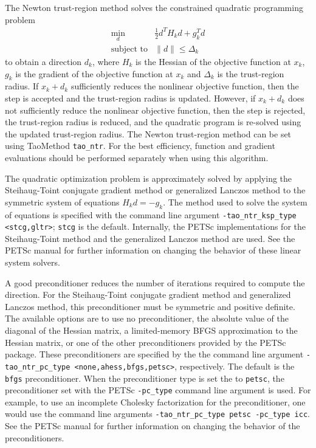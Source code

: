 The Newton trust-region method solves the constrained quadratic programming
problem
\[
\begin{array}{ll}
\min_d  & \frac{1}{2}d^T H_k d  + g_k^T d \\
\mbox{subject to} & \|d\| \leq \Delta_k
\end{array}
\]
to obtain a direction $d_k$, where $H_k$ is the Hessian of the objective 
function at $x_k$, $g_k$ is the gradient of the objective function at $x_k$ 
and $\Delta_k$ is the trust-region radius.  If $x_k + d_k$ sufficiently 
reduces the nonlinear objective function, then the step is accepted and the 
trust-region radius is updated.  However, if $x_k + d_k$ does not sufficiently
reduce the nonlinear objective function, then the step is rejected, the 
trust-region radius is reduced, and the quadratic program is re-solved 
using the updated trust-region radius. The Newton trust-region method 
can be set using TaoMethod {\tt tao\_ntr}.  For the best efficiency, 
function and gradient evaluations should be performed separately when 
using this algorithm.

The quadratic optimization problem is approximately solved by applying
the Steihaug-Toint conjugate gradient method or generalized Lanczos 
method to the symmetric system of equations $H_k d = -g_k$.  The method 
used to solve the system of equations is specified with the command line
argument {\tt -tao\_ntr\_ksp\_type <stcg,gltr>}; {\tt stcg} is the default.  
Internally, the PETSc implementations for the Steihaug-Toint method and the 
generalized Lanczos method are used.  See the PETSc manual for further 
information on changing the behavior of these linear system solvers.  

A good preconditioner reduces the number of iterations required to
compute the direction.  For the Steihaug-Toint conjugate gradient
method and generalized Lanczos method, this preconditioner must be
symmetric and positive definite.  The available options are to use no
preconditioner, the absolute value of the diagonal of the Hessian
matrix, a limited-memory BFGS approximation to the Hessian matrix, or
one of the other preconditioners provided by the PETSc package.  These
preconditioners are specified by the the command line argument 
{\tt -tao\_ntr\_pc\_type <none,ahess,bfgs,petsc>}, respectively.  The
default is the {\tt bfgs} preconditioner.  When the preconditioner
type is set the to {\tt petsc}, the preconditioner set with the PETSc
{\tt -pc\_type} command line argument is used.  For example, to use an
incomplete Cholesky factorization for the preconditioner, one would
use the command line arguments 
{\tt -tao\_ntr\_pc\_type petsc -pc\_type icc}.  See the PETSc manual 
for further information on changing the behavior of the preconditioners.

